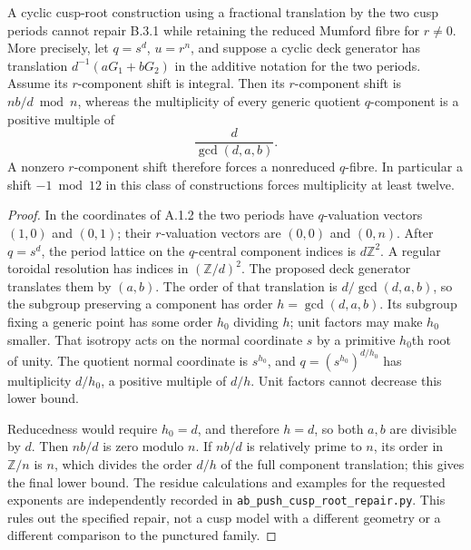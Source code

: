 \begin{proposition}\label{push:B33}
A cyclic cusp-root construction using a
fractional translation by the two cusp
periods cannot repair B.3.1 while retaining
the reduced Mumford fibre for $r\ne0$.
More precisely, let $q=s^d$, $u=r^n$,
and suppose a cyclic deck generator has
translation $d^{-1}(aG_1+bG_2)$ in the
additive notation for the two periods.
Assume its $r$-component shift is integral.
Then its $r$-component shift is
$nb/d\bmod n$, whereas the multiplicity
of every generic quotient $q$-component
is a positive multiple of
\[
 \frac{d}{\gcd(d,a,b)}.
\]
A nonzero $r$-component shift therefore
forces a nonreduced $q$-fibre. In
particular a shift $-1\bmod12$ in this
class of constructions forces multiplicity
at least twelve.
\end{proposition}
\begin{proof}
In the coordinates of A.1.2 the two
periods have $q$-valuation vectors
$(1,0)$ and $(0,1)$; their $r$-valuation
vectors are $(0,0)$ and $(0,n)$.
After $q=s^d$, the period lattice on
the $q$-central component indices is
$d\mathbb Z^2$. A regular toroidal
resolution has indices in
$(\mathbb Z/d)^2$. The proposed deck
generator translates them by $(a,b)$.
The order of that translation is
$d/\gcd(d,a,b)$, so the subgroup
preserving a component has order
$h=\gcd(d,a,b)$. Its subgroup fixing
a generic point has some order
$h_0$ dividing $h$; unit factors may
make $h_0$ smaller. That isotropy
acts on the normal coordinate $s$
by a primitive $h_0$th root of
unity. The quotient normal
coordinate is $s^{h_0}$, and
$q=(s^{h_0})^{d/h_0}$ has
multiplicity $d/h_0$, a positive
multiple of $d/h$. Unit factors
cannot decrease this lower bound.

Reducedness would require $h_0=d$,
and therefore $h=d$,
so both $a,b$ are divisible by $d$.
Then $nb/d$ is zero modulo $n$.
If $nb/d$ is relatively prime to
$n$, its order in $\mathbb Z/n$
is $n$, which divides the order
$d/h$ of the full component
translation; this gives the final
lower bound. The residue calculations
and examples for the requested
exponents are independently recorded
in \texttt{ab\_push\_cusp\_root\_repair.py}.
This rules out the specified repair,
not a cusp model with a different
geometry or a different comparison
to the punctured family.
\end{proof}

